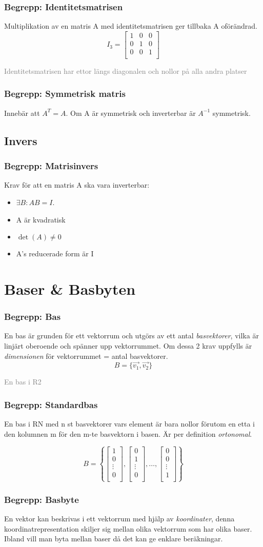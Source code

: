 \documentclass[10pt]{article}
\newcommand{\indelning} [1] {\subsection{#1}}
\newcommand{\begrepp} [1] {\subsubsection{\textcolor{Cerulean}{Begrepp: #1}}}
\newcommand{\comment} [1] {\begin{center}\textcolor{Gray}{#1} \end{center}}
\begin{document}
\begrepp{Identitetsmatrisen}
Multiplikation av en matris A med identitetsmatrisen ger tillbaka A oförändrad.
\begin{displaymath}
I_{3} =
\begin{bmatrix}
1 & 0 & 0 \\
0 & 1 & 0 \\
0 & 0 & 1 \\
\end{bmatrix}
\end{displaymath}
\comment{Identitetsmatrisen har ettor längs diagonalen och nollor på alla andra platser}

\begrepp{Symmetrisk matris}
Innebär att $A^T = A$.
Om A är symmetrisk och inverterbar är $A^{-1}$ symmetrisk.

\indelning{Invers}
\begrepp{Matrisinvers}
Krav för att en matris A ska vara inverterbar:
\begin{itemize}
\item $\exists B: AB = I$.
\item A är kvadratisk
\item $\det(A) \neq 0$
\item A's reducerade form är I
\end{itemize}
\section{Baser \& Basbyten}
\begrepp{Bas}
En bas är grunden för ett vektorrum och utgörs av ett antal \emph{basvektorer}, vilka är linjärt oberoende och spänner upp vektorrummet. Om dessa 2 krav uppfylls är \emph{dimensionen} för vektorrummet = antal basvektorer.
\begin{displaymath}
B = \{\vec{v_{1}}, \vec{v_{2}} \}
\end{displaymath}
\comment{En bas i R2}
\begrepp{Standardbas}
En bas i RN med n st basvektorer vars element är bara nollor förutom en etta i den kolumnen m för den m-te basvektorn i basen.
Är per definition \emph{ortonomal}.

\begin{displaymath}
B = \left \{
\begin{bmatrix}
1 \\
0 \\
\vdots \\
0 \\
\end{bmatrix}
,
\begin{bmatrix}
0 \\
1 \\
\vdots \\
0 \\
\end{bmatrix}
, \ldots
,
\begin{bmatrix}
0 \\
0 \\
\vdots \\
1 \\
\end{bmatrix}
\right \}
\end{displaymath}
\begrepp{Basbyte}
En vektor kan beskrivas i ett vektorrum med hjälp av \emph{koordinater}, denna koordinatrepresentation skiljer sig mellan olika vektorrum som har olika baser. Ibland vill man byta mellan baser 
då det kan ge enklare beräkningar.
\end{document}
